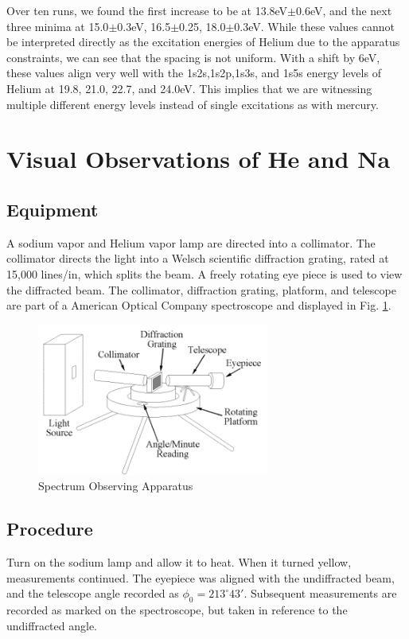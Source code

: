 \documentclass[12pt,twocolumn]{article}
\begin{document}
Over ten runs, we found the first increase to be at 13.8eV$\pm$0.6eV, and the next three minima at 15.0$\pm$0.3eV, 16.5$\pm$0.25, 18.0$\pm$0.3eV. While these values cannot be interpreted directly as the excitation energies of Helium due to the apparatus constraints, we can see that the spacing is not uniform. With a shift by 6eV, these values align very well with the 1s2s,1s2p,1s3s, and 1s5s energy levels of Helium at 19.8, 21.0, 22.7, and 24.0eV. This implies that we are witnessing multiple different energy levels instead of single excitations as with mercury.

\section{Visual Observations of He and Na}

\subsection{Equipment}

A sodium vapor and Helium vapor lamp are directed into a collimator. The collimator directs the light into a Welsch scientific diffraction grating, rated at 15,000 lines/in, which splits the beam. A freely rotating eye piece is used to view the diffracted beam. The collimator, diffraction grating, platform, and telescope are part of a American Optical Company spectroscope and displayed in Fig. \ref{fig:spectroscope}.

\begin{figure}[h!]
	\centering
	\includegraphics[width=3in]{images/spectroscope}
	\caption{Spectrum Observing Apparatus}
	\label{fig:spectroscope}
\end{figure}

\subsection{Procedure}
Turn on the sodium lamp and allow it to heat. When it turned yellow, measurements continued. The eyepiece was aligned with the undiffracted beam, and the telescope angle recorded as $\phi_{0}=213^{\circ}43'$. Subsequent measurements are recorded as marked on the spectroscope, but taken in reference to the undiffracted angle.
\end{document}
